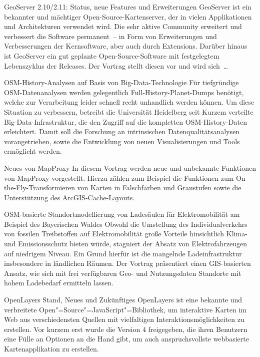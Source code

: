 %
{GeoServer 2.10/2.11: Status, neue Features und Erweiterungen}%
{}%
{GeoServer ist ein bekannter und mächtiger Open-Source-Kartenserver, der in
vielen Applikationen und Architek\-turen verwendet wird.
Die sehr aktive Community erweitert und verbessert die Software
permanent~-- in Form von Erweiterungen und Verbesserungen der Kernsoftware, aber
auch durch Extensions.
Darüber hinaus ist GeoServer ein gut geplante Open-Source-Software mit
festgelegtem Lebenszyklus der Releases. Der Vortrag
stellt diesen vor und wird
sich~\dots %
}


%
{OSM-History-Analysen auf Basis von Big-Data-Technologie}%
{}%
{Für tiefgründige OSM-Datenanalysen werden gelegentlich Full-History-Planet-Dumps benötigt, welche zur
Verarbeitung leider schnell recht unhandlich werden können. Um diese Situation zu verbessern,
betreibt die Universität Heidelberg seit Kurzem verteilte Big-Data-Infrastruktur, die den Zugriff
auf die kompletten OSM-History-Daten erleichtert. Damit soll die Forschung an intrinsischen
Datenqualitätsanalysen vorangetrieben, sowie die Entwicklung von neuen Visualisierungen und Tools
ermöglicht werden.}%

%
{Neues von MapProxy}%
{}%
{In diesem Vortrag werden neue und unbekannte Funktionen von MapProxy vorgestellt. Hierzu zählen zum
Beispiel die Funktionen zum On-the-Fly-Transformieren von Karten in Falschfarben und Graustufen
sowie die Unterstützung des ArcGIS-Cache-Layouts.}

%
{OSM-basierte Standortmodellierung von Ladesäulen für Elektromobilität am Beispiel des Bayerischen Waldes}%
{}%
{Obwohl die Umstellung des Individualverkehrs von fossilen Treibstoffen auf Elektromobilität große
Vorteile hinsichtlich Klima- und Emissionsschutz bieten würde, stagniert der Absatz von
Elektrofahrzeugen auf niedrigem Niveau. Ein Grund hierfür ist die mangelnde Ladeinfrastruktur
insbesondere in ländlichen Räumen. Der Vortrag präsentiert einen GIS-basierten Ansatz, wie sich mit
frei verfügbaren Geo- und Nutzungsdaten Standorte mit hohem Ladebedarf ermitteln lassen.}

%
{OpenLayers}%
{Stand, Neues und Zukünftiges}%
{OpenLayers ist eine bekannte und verbreitete
Open"=Source"=JavaScript"=Bibliothek, um interaktive Karten im Web aus
verschiedensten Quellen mit vielfaltigen Interaktionsmöglichkeiten zu
erstellen. Vor kurzem erst wurde die Version 4 freigegeben, die ihren
Benutzern eine Fülle an Optionen an die Hand gibt, um auch
anspruchsvollste webbasierte Kartenapplikation zu erstellen.}

